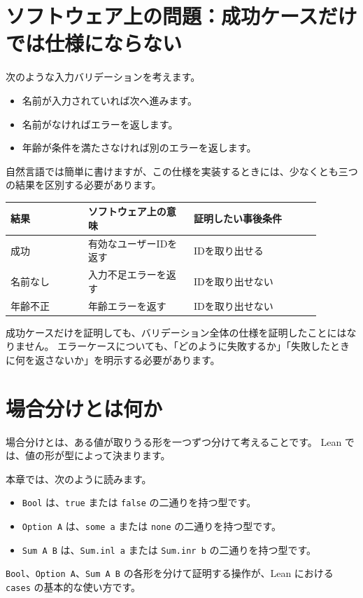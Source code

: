 
\section{ソフトウェア上の問題：成功ケースだけでは仕様にならない}

次のような入力バリデーションを考えます。

\begin{itemize}
\item 名前が入力されていれば次へ進みます。
\item 名前がなければエラーを返します。
\item 年齢が条件を満たさなければ別のエラーを返します。
\end{itemize}

自然言語では簡単に書けますが、この仕様を実装するときには、少なくとも三つの結果を区別する必要があります。

\begin{center}
\begin{tabular}{p{0.22\linewidth}p{0.30\linewidth}p{0.36\linewidth}}
\toprule
結果 & ソフトウェア上の意味 & 証明したい事後条件 \\
\midrule
成功 & 有効なユーザーIDを返す & IDを取り出せる \\
名前なし & 入力不足エラーを返す & IDを取り出せない \\
年齢不正 & 年齢エラーを返す & IDを取り出せない \\
\bottomrule
\end{tabular}
\end{center}

成功ケースだけを証明しても、バリデーション全体の仕様を証明したことにはなりません。
エラーケースについても、「どのように失敗するか」「失敗したときに何を返さないか」を明示する必要があります。

\section{場合分けとは何か}

場合分けとは、ある値が取りうる形を一つずつ分けて考えることです。
Lean では、値の形が型によって決まります。

本章では、次のように読みます。
\begin{itemize}
\item \texttt{Bool} は、\texttt{true} または \texttt{false} の二通りを持つ型です。
\item \texttt{Option A} は、\texttt{some a} または \texttt{none} の二通りを持つ型です。
\item \texttt{Sum A B} は、\texttt{Sum.inl a} または \texttt{Sum.inr b} の二通りを持つ型です。
\end{itemize}
\texttt{Bool}、\texttt{Option A}、\texttt{Sum A B} の各形を分けて証明する操作が、Lean における \texttt{cases} の基本的な使い方です。

